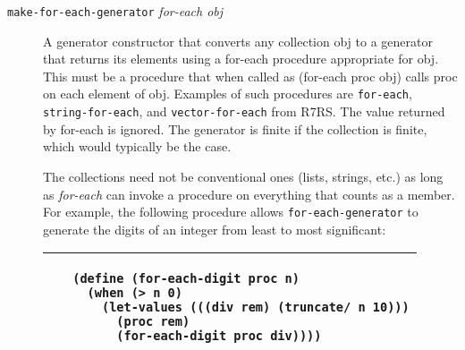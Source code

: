 \begin{description}
\item[\texttt{make-for-each-generator} \emph{for-each obj}]
A generator constructor that converts any collection obj to a generator
that returns its elements using a for-each procedure appropriate for
obj. This must be a procedure that when called as (for-each proc obj)
calls proc on each element of obj. Examples of such procedures are
\texttt{for-each}, \texttt{string-for-each}, and
\texttt{vector-for-each} from R7RS. The value returned by for-each is
ignored. The generator is finite if the collection is finite, which
would typically be the case.

The collections need not be conventional ones (lists, strings, etc.) as
long as \emph{for-each} can invoke a procedure on everything that counts
as a member. For example, the following procedure allows
\texttt{for-each-generator} to generate the digits of an integer from
least to most significant:

\begin{longtable}[]{@{}ll@{}}
\toprule
\begin{minipage}[t]{0.47\columnwidth}\raggedright\strut
~\strut
\end{minipage} & \begin{minipage}[t]{0.47\columnwidth}\raggedright\strut
\begin{verbatim}
(define (for-each-digit proc n)
  (when (> n 0)
    (let-values (((div rem) (truncate/ n 10)))
      (proc rem)
      (for-each-digit proc div))))
\end{verbatim}
\strut
\end{minipage}\tabularnewline
\bottomrule
\end{longtable}
\end{description}

